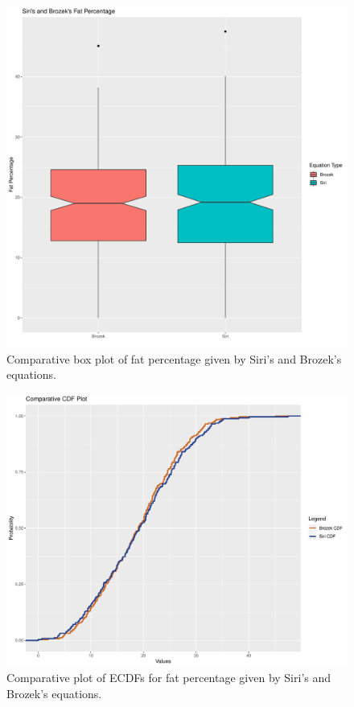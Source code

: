 \documentclass[11pt,american,american]{article}
\begin{document}
\newpage

\begin{figure}[H]
	\centering
	\includegraphics[width=0.7\linewidth]{Images/FIGURES/fat_percentage_boxplot}
	\caption{Comparative box plot of fat percentage given by Siri's and Brozek's equations.}
	\label{fig:fat_percentage_boxplot}
\end{figure}

\begin{figure}[H]
	\centering
	\includegraphics[width=0.75\linewidth]{Images/FIGURES/cdf_brozek_siri}
	\caption{Comparative plot of ECDFs for fat percentage given by Siri's and Brozek's equations.}
	\label{fig:cdf_brozek_siri}
\end{figure}

\newpage
\end{document}
